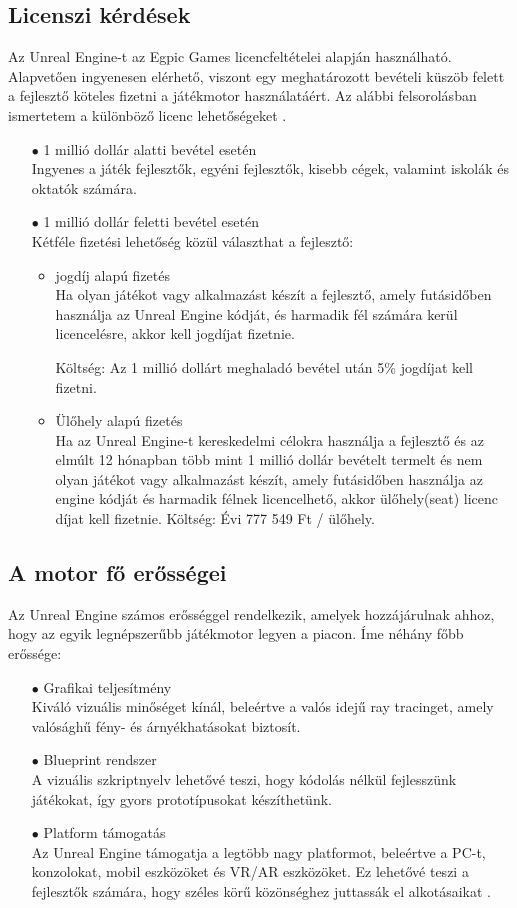 \documentclass[
]{thesis-ekf}
\theoremstyle{definition}
\theoremstyle{remark}
\begin{document}
\subsection{Licenszi kérdések}
Az Unreal Engine-t az Egpic Games licencfeltételei alapján használható. Alapvetően ingyenesen elérhető, viszont egy meghatározott bevételi küszöb felett a fejlesztő köteles fizetni a játékmotor használatáért. Az alábbi felsorolásban ismertetem a különböző licenc lehetőségeket \cite{UnrealLicences}.
\begin{itemize}
	\item[$\bullet$] 1 millió dollár alatti bevétel esetén \\ Ingyenes a játék fejlesztők, egyéni fejlesztők, kisebb cégek, valamint iskolák és oktatók számára.
	\item[$\bullet$]1 millió dollár feletti bevétel esetén \\  Kétféle fizetési lehetőség közül választhat a fejlesztő:
	\begin{itemize}
		\item jogdíj alapú fizetés \\Ha olyan játékot vagy alkalmazást készít a fejlesztő, amely futásidőben használja az Unreal Engine kódját, és harmadik fél számára kerül licencelésre, akkor kell jogdíjat fizetnie.
		
		Költség: Az 1 millió dollárt meghaladó bevétel után 5\% jogdíjat kell fizetni.
		\item Ülőhely alapú fizetés \\ Ha az Unreal Engine-t kereskedelmi célokra használja a fejlesztő és az elmúlt 12 hónapban több mint 1 millió dollár bevételt termelt és nem olyan játékot vagy alkalmazást készít, amely futásidőben használja az engine kódját és harmadik félnek licencelhető, akkor ülőhely(seat) licenc díjat kell fizetnie.
		Költség: Évi 777 549 Ft / ülőhely.
	\end{itemize}
\end{itemize}
\subsection{A motor fő erősségei}
Az Unreal Engine számos erősséggel rendelkezik, amelyek hozzájárulnak ahhoz, hogy az egyik legnépszerűbb játékmotor legyen a piacon. Íme néhány főbb erőssége:
\begin{itemize}
	\item[$\bullet$] Grafikai teljesítmény \\Kiváló vizuális minőséget kínál, beleértve a valós idejű ray tracinget, amely valósághű fény- és árnyékhatásokat biztosít.
	\item[$\bullet$] Blueprint rendszer \\ A vizuális szkriptnyelv lehetővé teszi, hogy kódolás nélkül fejlesszünk játékokat, így gyors prototípusokat készíthetünk.
	\item[$\bullet$] Platform támogatás \\Az Unreal Engine támogatja a legtöbb nagy platformot, beleértve a PC-t, konzolokat, mobil eszközöket és VR/AR eszközöket. Ez lehetővé teszi a fejlesztők számára, hogy széles körű közönséghez juttassák el alkotásaikat \cite{UnrealStrengths}.
\end{itemize}
\end{document}

